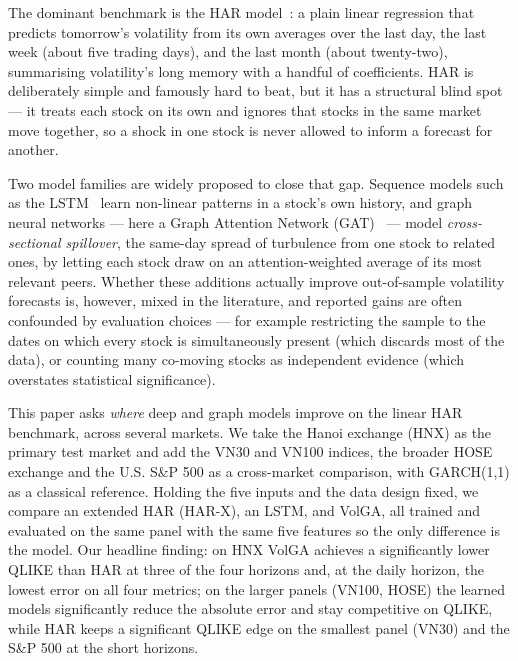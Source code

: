 \documentclass[runningheads]{llncs}
\begin{document}
The dominant benchmark is the HAR model~\cite{corsi2009}: a plain linear regression that predicts tomorrow's
volatility from its own averages over the last day, the last week (about five trading days), and the last month
(about twenty-two), summarising volatility's long memory with a handful of coefficients. HAR is deliberately
simple and famously hard to beat, but it has a structural blind spot --- it treats each stock on its own and
ignores that stocks in the same market move together, so a shock in one stock is never allowed to inform a
forecast for another.

Two model families are widely proposed to close that gap. Sequence models such as the LSTM~\cite{lstm1997}
learn non-linear patterns in a stock's own history, and graph neural networks --- here a Graph Attention Network
(GAT)~\cite{gat2018} --- model \emph{cross-sectional spillover}, the same-day spread of turbulence from one stock
to related ones, by letting each stock draw on an attention-weighted average of its most relevant peers. Whether
these additions actually improve out-of-sample volatility forecasts is, however, mixed in the literature, and
reported gains are often confounded by evaluation choices --- for example restricting the sample to the dates on
which every stock is simultaneously present (which discards most of the data), or counting many co-moving stocks
as independent evidence (which overstates statistical significance).

This paper asks \emph{where} deep and graph models improve on the linear HAR benchmark, across several markets. We take the Hanoi exchange (HNX) as the primary test market and add the VN30 and
VN100 indices, the broader HOSE exchange and the U.S. S\&P 500 as a cross-market comparison, with GARCH(1,1) as a
classical reference. Holding the five inputs and the data design fixed, we compare an extended HAR (HAR-X), an
LSTM, and VolGA, all trained and evaluated on the same panel with the same five features so the only difference
is the model. Our headline finding: on HNX VolGA achieves a significantly lower QLIKE than HAR at three of the four horizons and, at the daily horizon,
the lowest error on all four metrics; on the larger panels (VN100, HOSE) the learned models significantly
reduce the absolute error and stay competitive on QLIKE, while HAR keeps a significant QLIKE edge on the smallest
panel (VN30) and the S\&P 500 at the short horizons.
\end{document}
